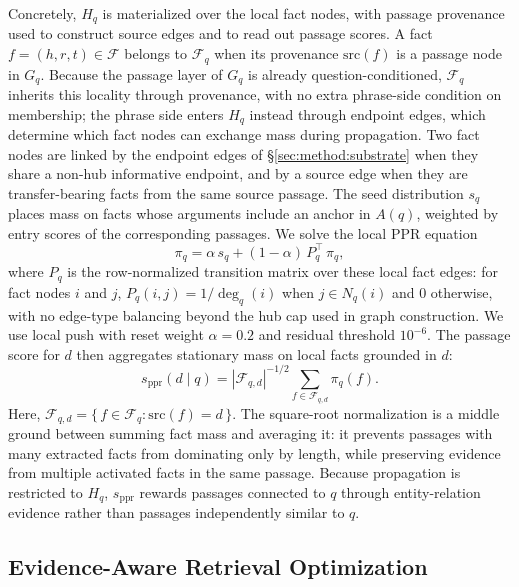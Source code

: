 Concretely, $H_q$ is materialized over the local fact nodes, with
passage provenance used to construct source edges and to read out
passage scores. A fact $f=(h,r,t) \in \mathcal{F}$ belongs to
$\mathcal{F}_q$ when its provenance $\mathrm{src}(f)$ is a passage
node in $G_q$. Because the passage layer of $G_q$ is already
question-conditioned, $\mathcal{F}_q$ inherits this locality through
provenance, with no extra phrase-side condition on membership; the
phrase side enters $H_q$ instead through endpoint edges, which
determine which fact nodes can exchange mass during propagation. Two fact nodes are
linked by the endpoint edges of \S\ref{sec:method:substrate} when they
share a non-hub informative endpoint, and by a source edge when they
are transfer-bearing facts from the same source passage. The seed
distribution $s_q$ places mass on facts whose arguments include an
anchor in $A(q)$, weighted by entry scores of the corresponding
passages. We solve the local PPR equation
\begin{equation}
\label{eq:local-ppr}
\pi_q = \alpha\, s_q + (1-\alpha)\, P_q^{\!\top}\, \pi_q,
\end{equation}
where $P_q$ is the row-normalized transition matrix over these local
fact edges: for fact nodes $i$ and $j$,
$P_q(i,j)=1/\deg_q(i)$ when $j \in N_q(i)$ and $0$ otherwise, with no
edge-type balancing beyond the hub cap used in graph construction. We
use local push with reset weight $\alpha=0.2$ and residual threshold
$10^{-6}$. The passage score for $d$ then aggregates stationary mass
on local facts grounded in $d$:
\begin{equation}
\label{eq:passage-score}
s_{\mathrm{ppr}}(d \mid q)
=
|\mathcal{F}_{q,d}|^{-1/2}
\sum_{f \in \mathcal{F}_{q,d}} \pi_q(f).
\end{equation}
Here,
$\mathcal{F}_{q,d}=\{\,f\in\mathcal{F}_q:\mathrm{src}(f)=d\,\}$.
The square-root normalization is a middle ground between summing fact
mass and averaging it: it prevents passages with many extracted facts
from dominating only by length, while preserving evidence from multiple
activated facts in the same passage. Because propagation is restricted
to $H_q$, $s_{\mathrm{ppr}}$ rewards passages connected to $q$ through
entity-relation evidence rather than passages independently similar to
$q$.

\subsection{Evidence-Aware Retrieval Optimization}
\label{sec:method:enhancement}

